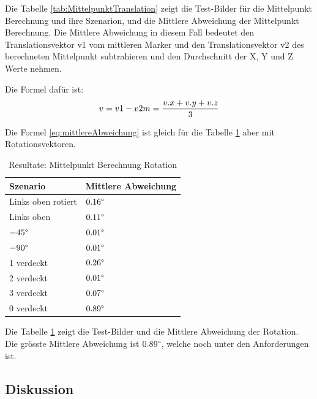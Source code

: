 Die Tabelle \ref{tab:MittelpunktTranslation} zeigt die Test-Bilder für die Mittelpunkt Berechnung und ihre Szenarion, und die Mittlere Abweichung der Mittelpunkt Berechnung.
Die Mittlere Abweichung in diesem Fall bedeutet den Translationsvektor v1 vom mittleren Marker und den Translationsvektor v2 des berechneten Mittelpunkt subtrahieren und den Durchschnitt der X, Y und Z Werte nehmen. 

Die Formel dafür ist: 
\begin{equation}
    v = v1 - v2\\
    m = \frac{v.x + v.y + v.z}{3}
    \label{eq:mittlereAbweichung}
\end{equation}

Die Formel \ref{eq:mittlereAbweichung} ist gleich für die Tabelle \ref{tab:MittelpunktRotation} aber mit Rotationsvektoren.

\begin{table}[!htb]
    \centering
    \caption{Resultate: Mittelpunkt Berechnung Rotation}
    \label{tab:MittelpunktRotation}
    \begin{tabular}{|l|l|}
            \hline
            Szenario &  Mittlere Abweichung\\
            \hline
            Links oben rotiert & \(0.16\degree\)\\
            \hline
            Links oben & \(0.11\degree\)\\
            \hline
            \(-45 \degree\) & \(0.01\degree\)\\
            \hline
            \(-90 \degree\) & \(0.01\degree\)\\
            \hline
            1 verdeckt & \(0.26\degree\)\\
            \hline
            2 verdeckt & \(0.01\degree\)\\
            \hline
            3 verdeckt & \(0.07\degree\)\\
            \hline
            0 verdeckt & \(0.89\degree\)\\
            \hline
    \end{tabular}
\end{table}

Die Tabelle \ref{tab:MittelpunktRotation} zeigt die Test-Bilder und die Mittlere Abweichung der Rotation.
Die grösste Mittlere Abweichung ist \(0.89\degree\), welche noch unter den Anforderungen ist.


\subsection{Diskussion}